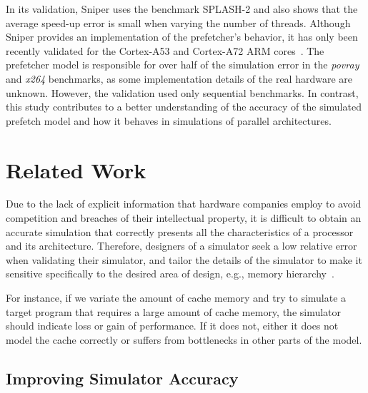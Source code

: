 \documentclass[AMA,final,STIX1COL]{WileyNJD-v2}
\newcommand{\ms}[1]{\textcolor{orange}{\bfseries \ul{ msserpa: #1} }\vspace{0.2cm}}
\newcommand{\fbm}[1]{\textcolor{red}{\bfseries \ul{fbm: #1} }\vspace{0.2cm}}
\begin{document}
In its validation, Sniper uses the benchmark SPLASH-2\cite{woo1995splash} and also shows that the average speed-up error is small when varying the number of threads.
%
Although Sniper provides an implementation of the prefetcher's behavior, it has only been recently validated for the Cortex-A53 and Cortex-A72 ARM cores~\cite{adileh2019racing}.
The prefetcher model is responsible for over half of the simulation error in the \emph{povray} and \emph{x264} benchmarks, as some implementation details of the real hardware are unknown.
However, the validation used only sequential benchmarks.
In contrast, this study contributes to a better understanding of the accuracy of the simulated prefetch model and how it behaves in simulations of parallel architectures.




\section{Related Work}\label{sec:related}


Due to the lack of explicit information that hardware companies employ to avoid competition and breaches of their intellectual property, it is difficult to obtain an accurate simulation that correctly presents all the characteristics of a processor and its architecture. 
Therefore, designers of a simulator seek a low relative error when validating their simulator, and tailor the details of the simulator to make it sensitive specifically to the desired area of design, e.g., memory hierarchy~\cite{eeckhout2010computer}. 

For instance, if we variate the amount of cache memory and try to simulate a target program that requires a large amount of cache memory, the simulator should indicate loss or gain of performance. 
If it does not, either it does not model the cache correctly or suffers from bottlenecks in other parts of the model.%

\subsection{Improving Simulator Accuracy}
\end{document}
